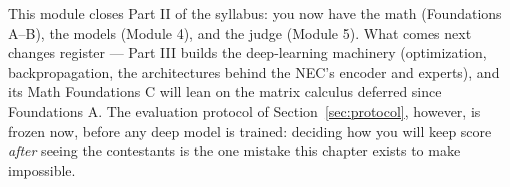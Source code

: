 \documentclass[11pt]{article}
\numberwithin{equation}{section}
\theoremstyle{plain}
\theoremstyle{definition}
\theoremstyle{remark}
\begin{document}
\medskip
This module closes Part II of the syllabus: you now have the math (Foundations A--B), the models (Module 4), and the judge (Module 5). What comes next changes register --- Part III builds the deep-learning machinery (optimization, backpropagation, the architectures behind the NEC's encoder and experts), and its Math Foundations C will lean on the matrix calculus deferred since Foundations A. The evaluation protocol of Section~\ref{sec:protocol}, however, is frozen now, before any deep model is trained: deciding how you will keep score \emph{after} seeing the contestants is the one mistake this chapter exists to make impossible.
\end{document}
